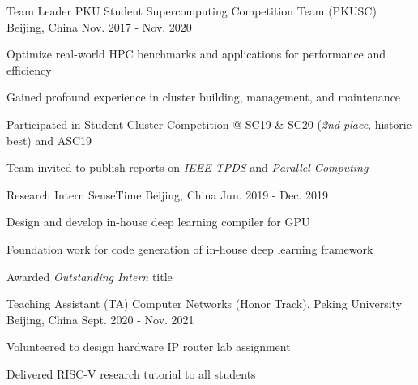 \begin{cventries}
  \cventry
    {Team Leader} %
    {PKU Student Supercomputing Competition Team (PKUSC)} %
    {Beijing, China} %
    {Nov. 2017 - Nov. 2020} %
    {
      \begin{cvitems} %
        \item {Optimize real-world HPC benchmarks and applications for performance and efficiency}
        \item {Gained profound experience in cluster building, management, and maintenance}
        \item {Participated in Student Cluster Competition @ SC19 \& SC20 (\textit{2nd place}, historic best) and ASC19}
        \item {Team invited to publish reports on \textit{IEEE TPDS} and \textit{Parallel Computing}}
      \end{cvitems}
    }

\end{cventries}


\begin{cventries}
    \cventry
    {Research Intern}
    {SenseTime}
    {Beijing, China}
    {Jun. 2019 - Dec. 2019}
    {
        \begin{cvitems}
        \item {Design and develop in-house deep learning compiler for GPU}
        \item {Foundation work for code generation of in-house deep learning framework}
        \item {Awarded \textit{Outstanding Intern} title}
        \end{cvitems}
    }
\end{cventries}


\begin{cventries}
    \cventry
    {Teaching Assistant (TA)}
    {Computer Networks (Honor Track), Peking University}
    {Beijing, China}
    {Sept. 2020 - Nov. 2021}
    {
        \begin{cvitems}
        \item {Volunteered to design hardware IP router lab assignment}
        \item {Delivered RISC-V research tutorial to all students}
        \end{cvitems}
    }
\end{cventries}
